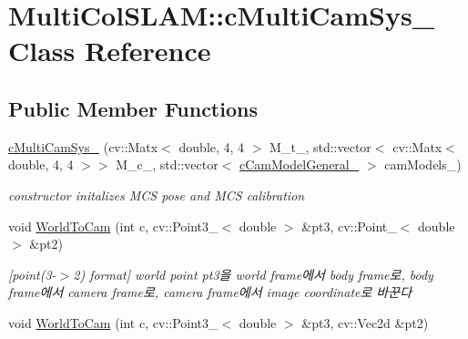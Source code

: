 \hypertarget{classMultiColSLAM_1_1cMultiCamSys__}{}\section{Multi\+Col\+S\+L\+AM\+:\+:c\+Multi\+Cam\+Sys\+\_\+ Class Reference}
\label{classMultiColSLAM_1_1cMultiCamSys__}
\subsection*{Public Member Functions}
\begin{DoxyCompactItemize}
\item 
\hyperlink{classMultiColSLAM_1_1cMultiCamSys___a94d83f3bd851844d9b86866b899aac14}{c\+Multi\+Cam\+Sys\+\_\+} (cv\+::\+Matx$<$ double, 4, 4 $>$ M\+\_\+t\+\_\+, std\+::vector$<$ cv\+::\+Matx$<$ double, 4, 4 $>$$>$ M\+\_\+c\+\_\+, std\+::vector$<$ \hyperlink{classMultiColSLAM_1_1cCamModelGeneral__}{c\+Cam\+Model\+General\+\_\+} $>$ cam\+Models\+\_\+)\hypertarget{classMultiColSLAM_1_1cMultiCamSys___a94d83f3bd851844d9b86866b899aac14}{}\label{classMultiColSLAM_1_1cMultiCamSys___a94d83f3bd851844d9b86866b899aac14}

\begin{DoxyCompactList}\small\item\em constructor initalizes M\+CS pose and M\+CS calibration \end{DoxyCompactList}\item 
void \hyperlink{classMultiColSLAM_1_1cMultiCamSys___a5252fc027f0a0f8db1b096392302eae8}{World\+To\+Cam} (int c, cv\+::\+Point3\+\_\+$<$ double $>$ \&pt3, cv\+::\+Point\+\_\+$<$ double $>$ \&pt2)\hypertarget{classMultiColSLAM_1_1cMultiCamSys___a5252fc027f0a0f8db1b096392302eae8}{}\label{classMultiColSLAM_1_1cMultiCamSys___a5252fc027f0a0f8db1b096392302eae8}

\begin{DoxyCompactList}\small\item\em \mbox{[}point(3-\/$>$2) format\mbox{]} world point pt3을 world frame에서 body frame로, body frame에서 camera frame로, camera frame에서 image coordinate로 바꾼다 \end{DoxyCompactList}\item 
void \hyperlink{classMultiColSLAM_1_1cMultiCamSys___abfc2a17f67cd88fbf51e1459b5618c96}{World\+To\+Cam} (int c, cv\+::\+Point3\+\_\+$<$ double $>$ \&pt3, cv\+::\+Vec2d \&pt2)\hypertarget{classMultiColSLAM_1_1cMultiCamSys___abfc2a17f67cd88fbf51e1459b5618c96}{}\label{classMultiColSLAM_1_1cMultiCamSys___abfc2a17f67cd88fbf51e1459b5618c96}


\end{DoxyCompactItemize}
